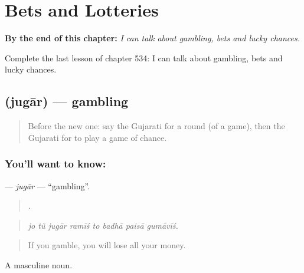 
\chapter{Bets and Lotteries}
\label{ch:gu-bets-and-lotteries}

\begin{chapteropening}
\textbf{By the end of this chapter:} \emph{I can talk about gambling, bets and lucky chances.}

Complete the last lesson of chapter 534: I can talk about gambling, bets and lucky chances.
\end{chapteropening}

\section[\texorpdfstring{\gu{જુગાર} (jugār)}{જુગાર (jugār)}]{ (jugār) — gambling}

\label{lesson:GU-C534-jugar}



\begin{quote}
Before the new one: say the Gujarati for a round (of a game), then the Gujarati for to play a game of chance.
\end{quote}

\subsection*{You'll want to know: }
\textbf{} — \emph{jugār} — \textquotedblleft{}gambling\textquotedblright{}.

\begin{quote}
       .
\end{quote}

\begin{quote}
\emph{jo tũ jugār ramīś to badhā paisā gumāvīś.}
\end{quote}

\begin{quote}
If you gamble, you will lose all your money.
\end{quote}

A masculine noun.


